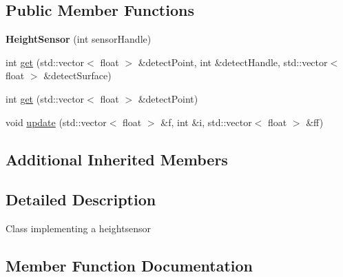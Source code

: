 \subsection*{Public Member Functions}
\begin{DoxyCompactItemize}
\item 
{\bfseries Height\+Sensor} (int sensor\+Handle)\hypertarget{classHeightSensor_adce900c49d253c6e9cd85db00c2f0708}{}\label{classHeightSensor_adce900c49d253c6e9cd85db00c2f0708}

\item 
int \hyperlink{classHeightSensor_abd4b7d4cc5906a971da402757989f5da}{get} (std\+::vector$<$ float $>$ \&detect\+Point, int \&detect\+Handle, std\+::vector$<$ float $>$ \&detect\+Surface)
\item 
int \hyperlink{classHeightSensor_a90a19e600e5b89a503366da0f0c35590}{get} (std\+::vector$<$ float $>$ \&detect\+Point)
\item 
void \hyperlink{classHeightSensor_a6966090886a414a6213125c91a31e128}{update} (std\+::vector$<$ float $>$ \&f, int \&i, std\+::vector$<$ float $>$ \&ff)
\end{DoxyCompactItemize}
\subsection*{Additional Inherited Members}


\subsection{Detailed Description}
Class implementing a heightsensor 

\subsection{Member Function Documentation}
